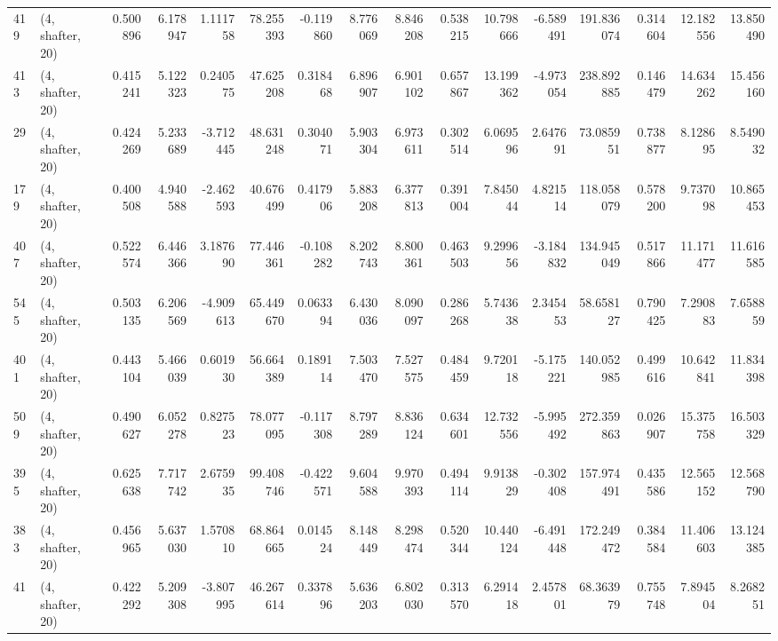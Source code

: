 \begin{tabular}{llrrrrrrrrrrrrrr}
419 &  (4, shafter, 20) &   0.500896 &   6.178947 &   1.111758 &    78.255393 &  -0.119860 &   8.776069 &   8.846208 &  0.538215 &  10.798666 &  -6.589491 &    191.836074 &   0.314604 &   12.182556 &   13.850490 \\
413 &  (4, shafter, 20) &   0.415241 &   5.122323 &   0.240575 &    47.625208 &   0.318468 &   6.896907 &   6.901102 &  0.657867 &  13.199362 &  -4.973054 &    238.892885 &   0.146479 &   14.634262 &   15.456160 \\
29  &  (4, shafter, 20) &   0.424269 &   5.233689 &  -3.712445 &    48.631248 &   0.304071 &   5.903304 &   6.973611 &  0.302514 &   6.069596 &   2.647691 &     73.085951 &   0.738877 &    8.128695 &    8.549032 \\
179 &  (4, shafter, 20) &   0.400508 &   4.940588 &  -2.462593 &    40.676499 &   0.417906 &   5.883208 &   6.377813 &  0.391004 &   7.845044 &   4.821514 &    118.058079 &   0.578200 &    9.737098 &   10.865453 \\
407 &  (4, shafter, 20) &   0.522574 &   6.446366 &   3.187690 &    77.446361 &  -0.108282 &   8.202743 &   8.800361 &  0.463503 &   9.299656 &  -3.184832 &    134.945049 &   0.517866 &   11.171477 &   11.616585 \\
545 &  (4, shafter, 20) &   0.503135 &   6.206569 &  -4.909613 &    65.449670 &   0.063394 &   6.430036 &   8.090097 &  0.286268 &   5.743638 &   2.345453 &     58.658127 &   0.790425 &    7.290883 &    7.658859 \\
401 &  (4, shafter, 20) &   0.443104 &   5.466039 &   0.601930 &    56.664389 &   0.189114 &   7.503470 &   7.527575 &  0.484459 &   9.720118 &  -5.175221 &    140.052985 &   0.499616 &   10.642841 &   11.834398 \\
509 &  (4, shafter, 20) &   0.490627 &   6.052278 &   0.827523 &    78.077095 &  -0.117308 &   8.797289 &   8.836124 &  0.634601 &  12.732556 &  -5.995492 &    272.359863 &   0.026907 &   15.375758 &   16.503329 \\
395 &  (4, shafter, 20) &   0.625638 &   7.717742 &   2.675935 &    99.408746 &  -0.422571 &   9.604588 &   9.970393 &  0.494114 &   9.913829 &  -0.302408 &    157.974491 &   0.435586 &   12.565152 &   12.568790 \\
383 &  (4, shafter, 20) &   0.456965 &   5.637030 &   1.570810 &    68.864665 &   0.014524 &   8.148449 &   8.298474 &  0.520344 &  10.440124 &  -6.491448 &    172.249472 &   0.384584 &   11.406603 &   13.124385 \\
41  &  (4, shafter, 20) &   0.422292 &   5.209308 &  -3.807995 &    46.267614 &   0.337896 &   5.636203 &   6.802030 &  0.313570 &   6.291418 &   2.457801 &     68.363979 &   0.755748 &    7.894504 &    8.268251 \\

\end{tabular}
